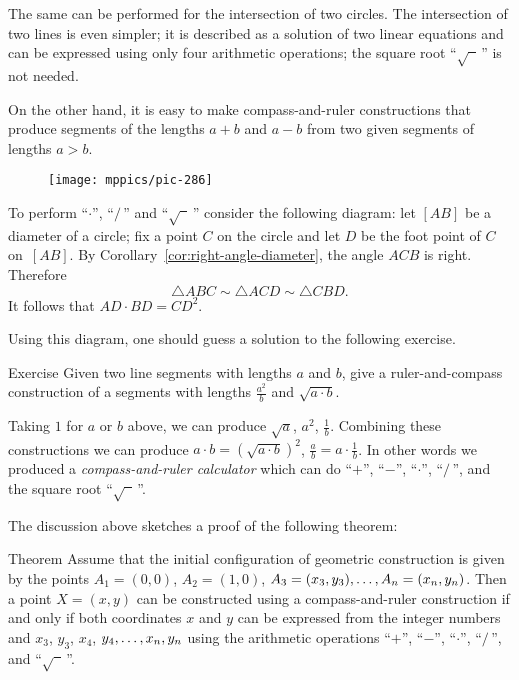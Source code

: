 The same can be performed for the intersection of two circles. 
The intersection of two lines is even simpler; 
it is described as a solution of two linear equations and can be expressed using only four arithmetic operations;
the square root ``$\sqrt{\phantom{a}}\,$'' is not needed.

\medskip

On the other hand, it is easy to make compass-and-ruler constructions that produce segments of the lengths $a+b$ and $a-b$ from two given segments of lengths $a>b$.

\begin{wrapfigure}{r}{37mm}
\vskip-4mm
\centering
\texttt{[image: mppics/pic-286]}
\end{wrapfigure}

To perform ``$\cdot$'', ``$/\,$''
and ``$\sqrt{\phantom{a}}\,$'' consider the following diagram:
let $[AB]$ be a diameter of a circle; 
fix a point $C$ on the circle and let $D$ be the foot point of $C$ on~$[AB]$.
By Corollary~\ref{cor:right-angle-diameter}, the angle $ACB$ is right.
Therefore 
$$\triangle ABC\sim\triangle ACD\sim \triangle CBD.$$
It follows that $AD\cdot BD=CD^2$. 

Using this diagram, one should guess a solution to the following exercise.

\begin{thm}{Exercise}\label{ex:a2/b}
Given two line segments with lengths $a$ and $b$, give a ruler-and-compass construction of a segments with lengths $\tfrac {a^2}b$ and $\sqrt{a\cdot b}$.
\end{thm}


Taking $1$ for $a$ or $b$ above, we can produce 
$\sqrt a$, $a^2$, $\tfrac1b$.
Combining these constructions we can produce
$a\cdot b=(\sqrt{a\cdot b})^2$,
$\tfrac ab=a\cdot\tfrac 1b$.
In other words we produced a \emph{compass-and-ruler calculator} which can do ``$+$'', ``$-$'', ``$\cdot$'', ``$/\,$'', and the square root ``$\sqrt{\phantom{a}}\,$''.

The discussion above sketches a proof of the following theorem:
 
\begin{thm}{Theorem}\label{thm:constructible-numbers}
Assume that the initial configuration of geometric construction is given by the points $A_1=(0,0)$, $A_2=(1,0)$, $A_3\z=(x_3,y_3),\z\dots,A_n=(x_n,y_n)$.
Then a point $X=(x,y)$ can be constructed using a compass-and-ruler construction
if and only if both coordinates $x$ and $y$ can be expressed from the integer numbers and $x_3$, $y_3$, $x_4$, $y_4,\z\dots,x_n,y_n$ using the arithmetic operations ``$+$'', ``$-$'', ``$\cdot$'', ``$/\,$'', and ``$\sqrt{\phantom{a}}\,$''.
\end{thm}

